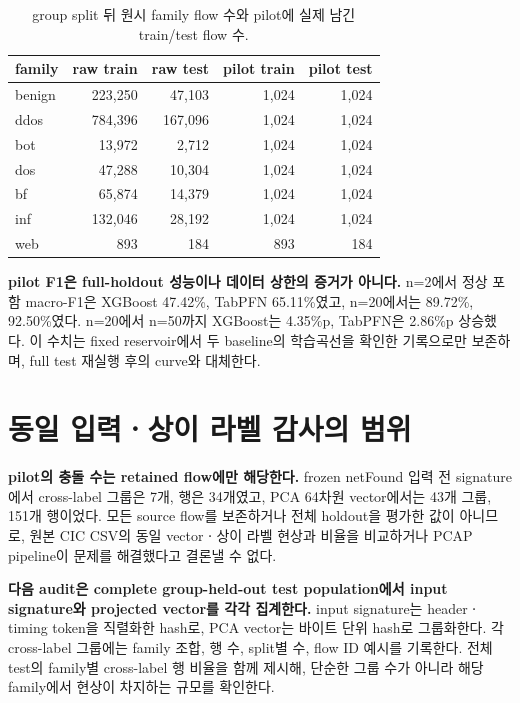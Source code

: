 \begin{table}[H]
\centering\small
\caption{group split 뒤 원시 family flow 수와 pilot에 실제 남긴 train/test flow 수.}
\begin{tabular}{lrrrr}
\toprule
family & raw train & raw test & pilot train & pilot test\\\midrule
benign & 223,250 & 47,103 & 1,024 & 1,024\\
ddos   & 784,396 & 167,096 & 1,024 & 1,024\\
bot    & 13,972 & 2,712 & 1,024 & 1,024\\
dos    & 47,288 & 10,304 & 1,024 & 1,024\\
bf     & 65,874 & 14,379 & 1,024 & 1,024\\
inf    & 132,046 & 28,192 & 1,024 & 1,024\\
web    & 893 & 184 & 893 & 184\\
\bottomrule
\end{tabular}
\end{table}

\textbf{pilot F1은 full-holdout 성능이나 데이터 상한의 증거가 아니다.} n=2에서 정상 포함 macro-F1은 XGBoost 47.42\%, TabPFN 65.11\%였고, n=20에서는 89.72\%, 92.50\%였다. n=20에서 n=50까지 XGBoost는 4.35\%p, TabPFN은 2.86\%p 상승했다. 이 수치는 fixed reservoir에서 두 baseline의 학습곡선을 확인한 기록으로만 보존하며, full test 재실행 후의 curve와 대체한다.


\section{동일 입력ㆍ상이 라벨 감사의 범위}
\textbf{pilot의 충돌 수는 retained flow에만 해당한다.} frozen netFound 입력 전 signature에서 cross-label 그룹은 7개, 행은 34개였고, PCA 64차원 vector에서는 43개 그룹, 151개 행이었다. 모든 source flow를 보존하거나 전체 holdout을 평가한 값이 아니므로, 원본 CIC CSV의 동일 vectorㆍ상이 라벨 현상과 비율을 비교하거나 PCAP pipeline이 문제를 해결했다고 결론낼 수 없다.

\textbf{다음 audit은 complete group-held-out test population에서 input signature와 projected vector를 각각 집계한다.} input signature는 headerㆍtiming token을 직렬화한 hash로, PCA vector는 바이트 단위 hash로 그룹화한다. 각 cross-label 그룹에는 family 조합, 행 수, split별 수, flow ID 예시를 기록한다. 전체 test의 family별 cross-label 행 비율을 함께 제시해, 단순한 그룹 수가 아니라 해당 family에서 현상이 차지하는 규모를 확인한다.

